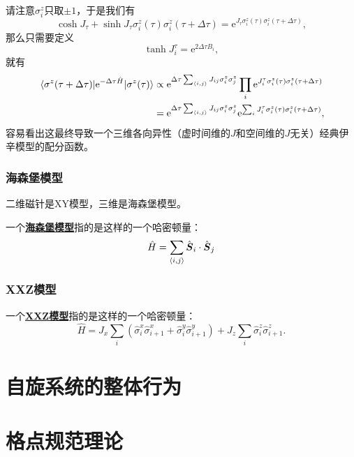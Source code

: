 \documentclass[hyperref, UTF8, a4paper]{ctexart}
\newcommand*{\ee}{\mathrm{e}}
\newcommand*{\pair}[1]{\langle #1 \rangle}
\newcommand*{\concept}[1]{\underline{\textbf{#1}}}
\begin{document}
请注意$\sigma_i^z$只取$\pm 1$，于是我们有
\[
    \cosh J_\tau + \sinh J_\tau \sigma^z_i(\tau) \sigma^z_i(\tau + \Delta \tau) = \ee^{J_\tau \sigma^z_i(\tau) \sigma^z_i(\tau + \Delta \tau)},
\]
那么只需要定义
\begin{equation}
    \tanh J^\tau_i = \ee^{2 \Delta \tau B_i}, 
\end{equation}
就有
\[
    \begin{aligned}
        \mel{\sigma^z(\tau + \Delta \tau)}{\ee^{-\Delta \tau \hat{H}}}{\sigma^z(\tau)} &\propto \ee^{\Delta \tau \sum_{\pair{i, j}} J_{ij} \sigma_i^z \sigma_j^z} \prod_i \ee^{J_i^\tau \sigma_i^z(\tau) \sigma_i^z(\tau + \Delta \tau)} \\
        &= \ee^{\Delta \tau \sum_{\pair{i, j}} J_{ij} \sigma_i^z \sigma_j^z} \ee^{\sum_i J_i^\tau \sigma_i^z(\tau) \sigma_i^z(\tau + \Delta \tau)},
    \end{aligned}
\]
容易看出这最终导致一个三维各向异性（虚时间维的$J$和空间维的$J$无关）经典伊辛模型的配分函数。

\subsubsection{海森堡模型}

二维磁针是XY模型，三维是海森堡模型。

一个\concept{海森堡模型}指的是这样的一个哈密顿量：
\begin{equation}
    \hat{H} = \sum_{\pair{i, j}} \hat{\vb*{S}}_i \cdot \hat{\vb*{S}}_j
\end{equation}

\subsubsection{XXZ模型}

一个\concept{XXZ模型}指的是这样的一个哈密顿量：
\begin{equation}
    \hat{H} = J_x \sum_i (\hat{\sigma}_{i}^x \hat{\sigma}_{i+1}^x + \hat{\sigma}_{i}^y \hat{\sigma}_{i+1}^y) + J_z \sum_{i} \hat{\sigma}_i^z \hat{\sigma}_{i+1}^z.
\end{equation}

\section{自旋系统的整体行为}

\section{格点规范理论}
\end{document}
